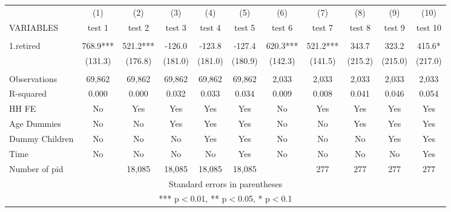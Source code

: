 \begin{tabular}{lcccccccccc} \hline
 & (1) & (2) & (3) & (4) & (5) & (6) & (7) & (8) & (9) & (10) \\
VARIABLES & test 1 & test 2 & test 3 & test 4 & test 5 & test 6 & test 7 & test 8 & test 9 & test 10 \\ \hline
 &  &  &  &  &  &  &  &  &  &  \\
1.retired & 768.9*** & 521.2*** & -126.0 & -123.8 & -127.4 & 620.3*** & 521.2*** & 343.7 & 323.2 & 415.6* \\
 & (131.3) & (176.8) & (181.0) & (181.0) & (180.9) & (142.3) & (141.5) & (215.2) & (215.0) & (217.0) \\
 &  &  &  &  &  &  &  &  &  &  \\
Observations & 69,862 & 69,862 & 69,862 & 69,862 & 69,862 & 2,033 & 2,033 & 2,033 & 2,033 & 2,033 \\
R-squared & 0.000 & 0.000 & 0.032 & 0.033 & 0.034 & 0.009 & 0.008 & 0.041 & 0.046 & 0.054 \\
HH FE & No & Yes & Yes & Yes & Yes & No & Yes & Yes & Yes & Yes \\
Age Dummies & No & No & Yes & Yes & Yes & No & No & Yes & Yes & Yes \\
Dummy Children & No & No & No & Yes & Yes & No & No & No & Yes & Yes \\
Time & No & No & No & No & Yes & No & No & No & No & Yes \\
 Number of pid &  & 18,085 & 18,085 & 18,085 & 18,085 &  & 277 & 277 & 277 & 277 \\ \hline
\multicolumn{11}{c}{ Standard errors in parentheses} \\
\multicolumn{11}{c}{ *** p$<$0.01, ** p$<$0.05, * p$<$0.1} \\
\end{tabular}
